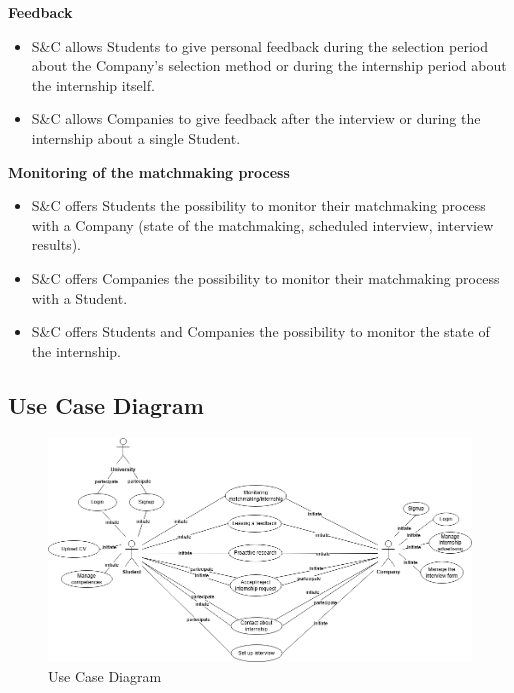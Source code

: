 \textbf{Feedback}
\begin{itemize}
    \item [\text{[R23]}] S\&C allows Students to give personal feedback during the selection period about the Company's selection method or during the internship period about the internship itself.

    \item [\text{[R24]}] S\&C allows Companies to give feedback after the interview or during the internship about a single Student.
\end{itemize}

\textbf{Monitoring of the matchmaking process}
\begin{itemize}
    \item [\text{[R25]}] S\&C offers Students the possibility to monitor their matchmaking process with a Company (state of the matchmaking, scheduled interview, interview results).

    \item [\text{[R26]}] S\&C offers Companies the possibility to monitor their matchmaking process with a Student.

    \item [\text{[R27]}] S\&C offers Students and Companies the possibility to monitor the state of the internship.
\end{itemize}

\subsection{Use Case Diagram}

\begin{figure}[H]
    \centering
    \includegraphics[width=15cm]{Images/usecasediagram2.png}
    \caption{Use Case Diagram}
\end{figure}

